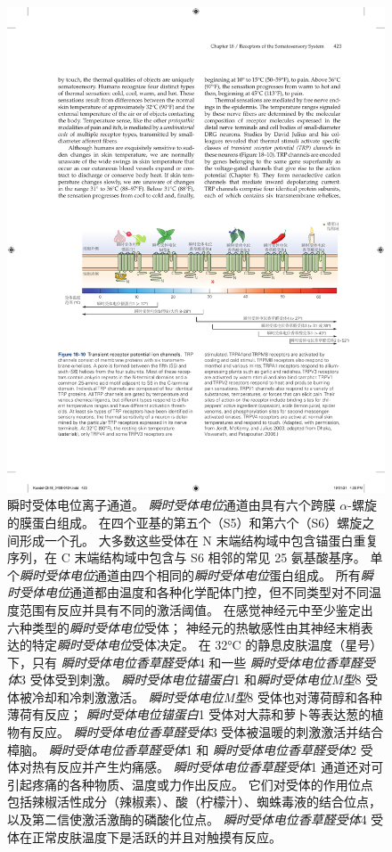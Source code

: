 \begin{figure}[htbp]
	\centering
	\includegraphics[width=1.0\linewidth]{chap18/fig_18_10}
	\caption{瞬时受体电位离子通道。
		\textit{瞬时受体电位}通道由具有六个跨膜 $\alpha$-螺旋的膜蛋白组成。
		在四个亚基的第五个（S5）和第六个（S6）螺旋之间形成一个孔。
		大多数这些受体在 N 末端结构域中包含锚蛋白重复序列，在 C 末端结构域中包含与 S6 相邻的常见 25 氨基酸基序。
		单个\textit{瞬时受体电位}通道由四个相同的\textit{瞬时受体电位}蛋白组成。
		所有\textit{瞬时受体电位}通道都由温度和各种化学配体门控，但不同类型对不同温度范围有反应并具有不同的激活阈值。
		在感觉神经元中至少鉴定出六种类型的\textit{瞬时受体电位}受体； 神经元的热敏感性由其神经末梢表达的特定\textit{瞬时受体电位}受体决定。
		在 32°C 的静息皮肤温度（星号）下，只有 \textit{瞬时受体电位香草醛受体}4 和一些 \textit{瞬时受体电位香草醛受体}3 受体受到刺激。
		\textit{瞬时受体电位锚蛋白}1 和\textit{瞬时受体电位M型}8 受体被冷却和冷刺激激活。
		\textit{瞬时受体电位M型}8 受体也对薄荷醇和各种薄荷有反应；
		\textit{瞬时受体电位锚蛋白}1 受体对大蒜和萝卜等表达葱的植物有反应。
		\textit{瞬时受体电位香草醛受体}3 受体被温暖的刺激激活并结合樟脑。
		\textit{瞬时受体电位香草醛受体}1 和 \textit{瞬时受体电位香草醛受体}2 受体对热有反应并产生灼痛感。 
		\textit{瞬时受体电位香草醛受体}1 通道还对可引起疼痛的各种物质、温度或力作出反应。
		它们对受体的作用位点包括辣椒活性成分（辣椒素）、酸（柠檬汁）、蜘蛛毒液的结合位点，以及第二信使激活激酶的磷酸化位点。
		\textit{瞬时受体电位香草醛受体}4 受体在正常皮肤温度下是活跃的并且对触摸有反应\cite{jordt2003lessons}。}
	\label{fig:18_10}
\end{figure}


